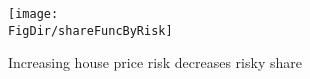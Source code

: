 \begin{figure}[h]
	\centering
	\texttt{[image: \\FigDir/shareFuncByRisk]}
	\caption{Increasing house price risk decreases risky share}
	\label{fig:shareFuncByRisk}
\end{figure}
